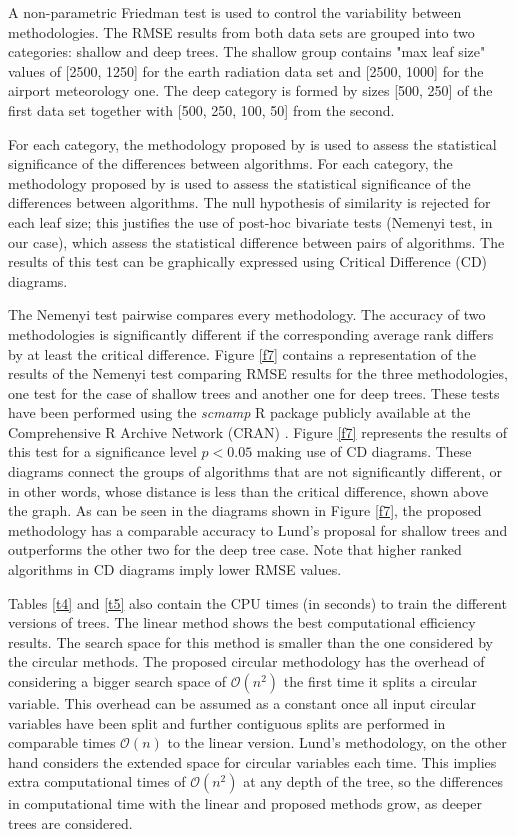 \documentclass[times,twocolumn,final,authoryear]{elsarticle}
\begin{document}
A non-parametric Friedman test is used to control the variability between methodologies. The RMSE results from both data sets are grouped into two categories: shallow and deep trees. The shallow group contains "max leaf size" values of [2500, 1250] for the earth radiation data set and [2500, 1000] for the airport meteorology one. The deep category is formed by sizes [500, 250] of the first data set together with [500, 250, 100, 50] from the second.

For each category, the methodology proposed by \citep{Demsar2006} is used to assess the statistical significance of the differences between algorithms. For each category, the methodology proposed by \citep{Demsar2006} is used to assess the statistical significance of the differences between algorithms. The null hypothesis of similarity is rejected for each leaf size; this justifies the use of post-hoc bivariate tests (Nemenyi test, in our case), which assess the statistical difference between pairs of algorithms. The results of this test can be graphically expressed using Critical Difference (CD) diagrams.

The Nemenyi test pairwise compares every methodology. The accuracy of two methodologies is significantly different if the corresponding average rank differs by at least the critical difference. Figure \ref{f7} contains a representation of the results of the Nemenyi test comparing RMSE results for the three methodologies, one test for the case of shallow trees and another one for deep trees. These tests have been performed using the \textit{scmamp} R package publicly available at the Comprehensive R Archive Network (CRAN) \citep{Calvo2015}. Figure \ref{f7} represents the results of this test for a significance level $ p < 0.05 $ making use of CD diagrams.  These diagrams connect the groups of algorithms that are not significantly different, or in other words, whose distance is less than the critical difference, shown above the graph. As can be seen in the diagrams shown in Figure \ref{f7}, the proposed methodology has a comparable accuracy to Lund's proposal for shallow trees and outperforms the other two for the deep tree case. Note that higher ranked algorithms in CD diagrams imply lower RMSE values.

Tables \ref{t4} and \ref{t5} also contain the CPU times (in seconds) to train the different versions of trees. The linear method shows the best computational efficiency results. The search space for this method is smaller than the one considered by the circular methods. The proposed circular methodology has the overhead of considering a bigger search space of $\mathcal{O}(n^2)$ the first time it splits a circular variable. This overhead can be assumed as a constant once all input circular variables have been split and further contiguous splits are performed in comparable times $\mathcal{O}(n)$ to the linear version. Lund's methodology, on the other hand considers the extended space for circular variables each time. This implies extra computational times of $\mathcal{O}(n^2)$ at any depth of the tree, so the differences in computational time with the linear and proposed methods grow, as deeper trees are considered.
\end{document}
